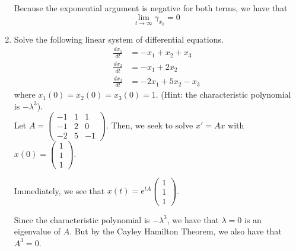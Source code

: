 \documentclass[12pt]{article}
\begin{document}
\begin{enumerate}
        Because the exponential argument is negative for both terms, we have that 
        \[\boxed{\lim_{t \to \infty} \gamma_{x_0} = 0}\]

    \color{black}

\pagebreak
\item  Solve the following linear system of differential equations.
\begin{align*}
\frac{dx_{1}}{dt} &= -x_{1}+x_{2}+x_{3} \\
\frac{dx_{2}}{dt} &= -x_{1} + 2x_{2} \\
\frac{dx_{3}}{dt} &= -2x_{1}+5x_{2}-x_{3}
\end{align*}
where $x_{1}(0) = x_{2}(0) = x_{3}(0) = 1$.  (Hint: the characteristic polynomial is $-\lambda^{3}$).  \\

    \color{blue}
        Let $A = \begin{pmatrix}
            -1 & 1 & 1\\
            -1 & 2 & 0\\
            -2 & 5 & -1
        \end{pmatrix}$. Then, we seek to solve $x' = Ax$ with $x(0) = \begin{pmatrix}
            1\\1\\1
        \end{pmatrix}$. 

        Immediately, we see that $x(t) = e^{tA}\begin{pmatrix}
            1\\1\\1
        \end{pmatrix}$.

        Since the characteristic polynomial is $-\lambda^3$, we have that $\lambda = 0$ is an eigenvalue of $A$. But by the Cayley Hamilton Theorem, we also have that $A^3 = 0$. 


\end{enumerate}
\end{document}
